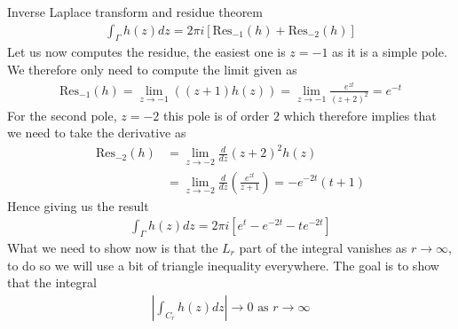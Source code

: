 \begin{parag}{Inverse Laplace transform and residue theorem}
	\begin{align*} 
		\int_{\Gamma} h\left(z\right)dz =  2\pi i \left[\text{Res}_{-1}\left(h\right) + \text{Res}_{-2}\left(h\right)\right]
	\end{align*}
	Let us now computes the residue, the easiest one is $z =  -1$ as it is a simple pole. We therefore only need to compute the limit given as 
	\begin{align*} 
		\text{Res}_{-1}\left(h\right) = \lim_{z \to -1} \left(\left(z + 1\right)h\left(z\right)\right) = \lim_{z \to -1} \frac{e^{zt}}{\left(z + 2\right)^2} = e^{-t}
	\end{align*}
	For the second pole, $z = -2$ this pole is of order $2$ which therefore implies that we need to take the derivative as 
	\begin{align*} 
		\text{Res}_{-2}\left(h\right) &= \lim_{z \to -2} \frac{d}{dz} \left(z + 2\right)^2 h\left(z\right)\\
		&= \lim_{z \to -2}  \frac{d}{dz} \left(\frac{e^{zt}}{z + 1}\right) = -e^{-2t}\left(t + 1\right)
	\end{align*}
	Hence giving us the result 
	\begin{align*} 
		\int_{\Gamma} h\left(z\right) dz = 2\pi i \left[e^{t} - e^{-2t} - te^{-2t}\right]
	\end{align*}
	What we need to show now is that the $L_r$ part of the integral vanishes as $r \to \infty$, to do so we will use a bit of triangle inequality everywhere. The goal is to show that the integral 
	\begin{align*} 
		\left|\int_{C_r} h\left(z\right)dz\right| \to 0 \text{ as }r \to \infty
	\end{align*}


\end{parag}
